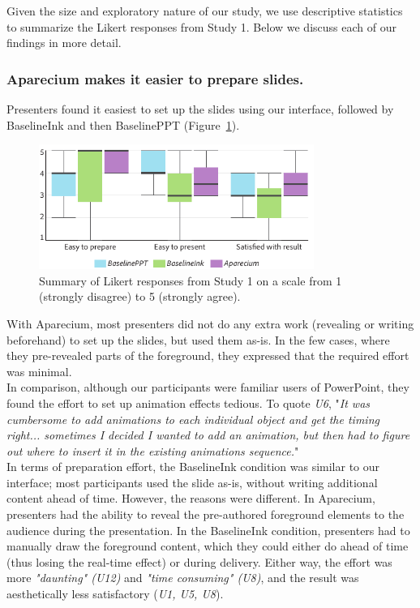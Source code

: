 Given the size and exploratory nature of our study, we use descriptive statistics to summarize the Likert responses from Study 1. Below we discuss each of our findings in more detail.\\

\subsubsection{Aparecium makes it easier to prepare slides.}
Presenters found it easiest to set up the slides using our interface, followed by BaselineInk and then BaselinePPT (Figure~\ref{fig:likert}). 
%
\begin{figure}[h!]
    \centering
        \includegraphics[width=0.8\textwidth]{figures/study1likert}
        \caption{Summary of Likert responses from Study 1 on a scale from 1 (strongly disagree) to 5 (strongly agree).}
\label{fig:likert}
\end{figure}
%
With Aparecium, most presenters did not do any extra work (revealing or writing beforehand) to set up the slides, but used them as-is. In the few cases, where they pre-revealed parts of the foreground, they expressed that the required effort was minimal.\\ 

In comparison, although our participants were familiar users of PowerPoint, they found the effort to set up animation effects tedious. To quote \textit{U6}, "\textit{It was cumbersome to add animations to each individual object and get the timing right... sometimes I decided I wanted to add an animation, but then had to figure out where to insert it in the existing animations sequence.}"\\

In terms of preparation effort, the BaselineInk condition was similar to our interface; most participants used the slide as-is, without writing additional content ahead of time. However, the reasons were different. In Aparecium, presenters had the ability to reveal the pre-authored foreground elements to the audience during the presentation. In the BaselineInk condition, presenters had to manually draw the foreground content, which they could either do ahead of time (thus losing the real-time effect) or during delivery. Either way, the effort was more \textit{"daunting"  (U12)} and  \textit{"time consuming" (U8)}, and the result was aesthetically less satisfactory (\textit{U1, U5, U8}).  

